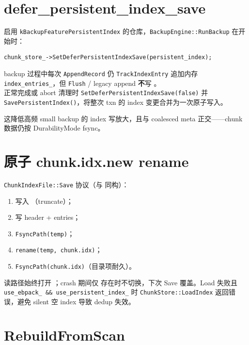 \section{defer\_persistent\_index\_save}

\begin{designbox}[v0.3.1+ 写放大优化]
启用 \texttt{kBackupFeaturePersistentIndex} 的仓库，\texttt{BackupEngine::RunBackup} 在开始时：
\begin{verbatim}
chunk_store_->SetDeferPersistentIndexSave(persistent_index);
\end{verbatim}
backup 过程中每次 \texttt{AppendRecord} 仍 \texttt{TrackIndexEntry} 追加内存 \texttt{index\_entries\_}，但 \texttt{Flush} / legacy append \textbf{不}写 。\\
正常完成或 abort 清理时 \texttt{SetDeferPersistentIndexSave(false)} 并 \texttt{SavePersistentIndex()}，将整次 txn 的 index 变更合并为一次原子写入。
\end{designbox}

这降低高频 small backup 的 index 写放大，且与 coalesced meta 正交——chunk 数据仍按 DurabilityMode fsync。

\section{原子 chunk.idx.new rename}

\texttt{ChunkIndexFile::Save} 协议（与  同构）：

\begin{enumerate}[nosep]
  \item 写入 （truncate）；
  \item 写 header + entries；
  \item \texttt{FsyncPath(temp)}；
  \item \texttt{rename(temp, chunk.idx)}；
  \item \texttt{FsyncPath(chunk.idx)}（目录项耐久）。
\end{enumerate}

读路径始终打开 ；crash 期间仅  存在时不切换，下次 Save 覆盖。Load 失败且 \texttt{use\_ebpack\_ \&\& use\_persistent\_index\_} 时 \texttt{ChunkStore::LoadIndex} 返回错误，避免 silent 空 index 导致 dedup 失效。

\section{RebuildFromScan}

